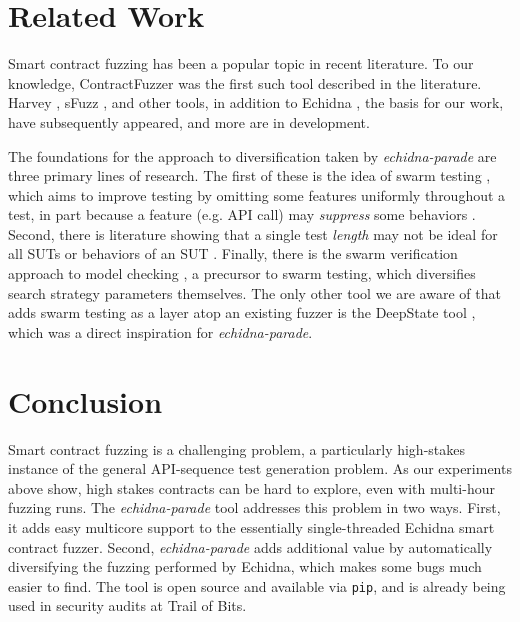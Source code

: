 \documentclass[sigconf]{acmart}
\begin{document}
{\section{Related Work}

Smart contract fuzzing has been a popular topic in recent literature.  To our knowledge, ContractFuzzer \cite{jiang:ase:2018} was the first such tool described in the literature.  Harvey \cite{harvey}, sFuzz \cite{sfuzz}, and other tools, in addition to Echidna \cite{echidnaissta}, the basis for our work, have subsequently appeared, and more are in development.

The foundations for the approach to diversification taken by \emph{echidna-parade} are three primary lines of research.  The first of these is the idea of swarm testing \cite{ISSTA12}, which aims to improve testing by omitting some features uniformly throughout a test, in part because a feature (e.g. API call) may \emph{suppress} some behaviors \cite{groce2013help}.   Second, there is literature showing that a single test \emph{length} may not be ideal for all SUTs or behaviors of an SUT \cite{ASE08,ArcuriLen}.  Finally, there is the swarm verification approach to model checking \cite{swarmIEEE}, a precursor to swarm testing, which diversifies search strategy parameters themselves.  The only other tool we are aware of that adds swarm testing as a layer atop an existing fuzzer is the DeepState tool \cite{goodman2018deepstate}, which was a direct inspiration for \emph{echidna-parade}.

\section{Conclusion}

Smart contract fuzzing is a challenging problem, a particularly high-stakes instance of the general API-sequence test generation problem.  As our experiments above show, high stakes contracts can be hard to explore, even with multi-hour fuzzing runs.  The \emph{echidna-parade} tool addresses this problem in two ways.  First, it adds easy multicore support to the essentially single-threaded Echidna smart contract fuzzer.  Second, \emph{echidna-parade} adds additional value by automatically diversifying the fuzzing performed by Echidna, which makes some bugs much easier to find.  The tool is open source and available via {\tt pip}, and is already being used in security audits at Trail of Bits.




}
\end{document}
